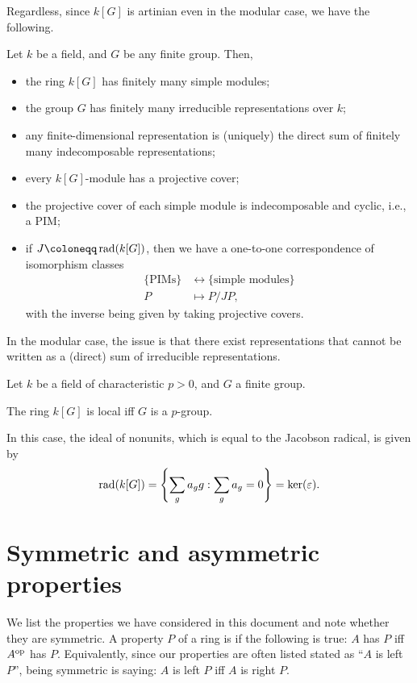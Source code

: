 \documentclass[12pt]{article}
\begin{document}
Regardless, since $k[G]$ is artinian even in the modular case, we have the following.
\begin{thm}
	Let $k$ be a field, and $G$ be any finite group. 
	Then,
	\begin{itemize}
		\item the ring $k[G]$ has finitely many simple modules;
		\item the group $G$ has finitely many irreducible representations over $k$;
		\item any finite-dimensional representation is (uniquely) the direct sum of finitely many indecomposable representations;
		\item every $k[G]$-module has a projective cover;
		\item the projective cover of each simple module is indecomposable and cyclic, i.e., a PIM;
		\item if $J \coloneqq \rad(k[G])$, then we have a one-to-one correspondence of isomorphism classes
		\begin{align*} 
			\{\text{PIMs}\} & \leftrightarrow \{\text{simple modules}\} \\
			P & \mapsto P/JP,
		\end{align*}
		with the inverse being given by taking projective covers.
	\end{itemize}
\end{thm}
In the modular case, the issue is that there exist representations that cannot be written as a (direct) sum of irreducible representations.

\begin{thm}
	Let $k$ be a field of characteristic $p > 0$, 
	and $G$ a finite group.

	The ring $k[G]$ is local iff $G$ is a $p$-group. 

	In this case, the ideal of nonunits, which is equal to the Jacobson radical, is given by
	\begin{equation*} 
		\operatorname{rad}(k[G]) = \left\{\sum_{g} a_{g} g : \sum_{g} a_{g} = 0\right\} = \ker(\varepsilon).
	\end{equation*}
\end{thm}

\section{Symmetric and asymmetric properties}

We list the properties we have considered in this document and note whether they are symmetric. 
A property $P$ of a ring is  if the following is true: $A$ has $P$ iff $A^{\operatorname{op}}$ has $P$. \newline
Equivalently, since our properties are often listed stated as ``$A$ is left $P$'', being symmetric is saying: $A$ is left $P$ iff $A$ is right $P$.
\end{document}
